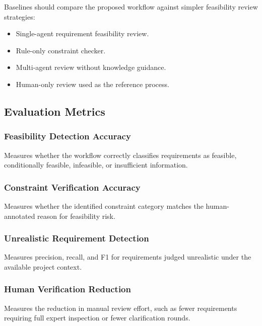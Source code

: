 Baselines should compare the proposed workflow against simpler feasibility review strategies:
\begin{itemize}[leftmargin=*]
  \item Single-agent requirement feasibility review.
  \item Rule-only constraint checker.
  \item Multi-agent review without knowledge guidance.
  \item Human-only review used as the reference process.
\end{itemize}

\subsection{Evaluation Metrics}
\label{exp:metrics}

\subsubsection{Feasibility Detection Accuracy}
\label{exp:metric_feasibility}

Measures whether the workflow correctly classifies requirements as feasible, conditionally feasible, infeasible, or insufficient information.

\subsubsection{Constraint Verification Accuracy}
\label{exp:metric_constraint}

Measures whether the identified constraint category matches the human-annotated reason for feasibility risk.

\subsubsection{Unrealistic Requirement Detection}
\label{exp:metric_unrealistic}

Measures precision, recall, and F1 for requirements judged unrealistic under the available project context.

\subsubsection{Human Verification Reduction}
\label{exp:metric_human}

Measures the reduction in manual review effort, such as fewer requirements requiring full expert inspection or fewer clarification rounds.

